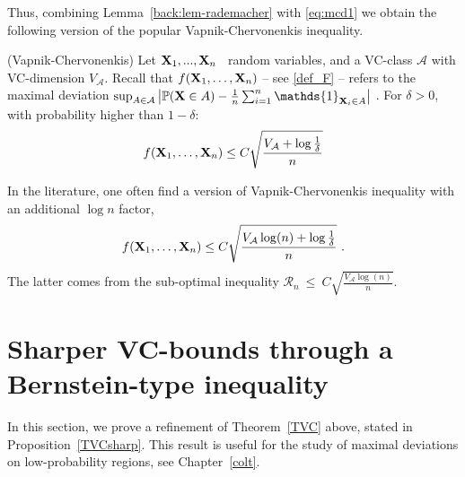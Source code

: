 Thus, combining Lemma~\ref{back:lem-rademacher} with \eqref{eq:mcd1} we obtain the following version of the popular Vapnik-Chervonenkis inequality.
\begin{theorem}{\sc (Vapnik-Chervonenkis)}
\label{TVC}
Let $\mathbf X_1,...,\mathbf X_n$ \iid~random variables, and a VC-class $\mathcal{A}$ with VC-dimension $V_{\mathcal{A}}$. 
Recall that $f(\mathbf X_1,\ldots,\mathbf X_n)$ -- see \eqref{def_F} -- refers to the maximal deviation $\sup_{A \in \mathcal{A}} \left | \mathbb{P}(\mb X \in A) - \frac{1}{n} \sum_{i=1}^n \mathds{1}_{\mb X_i \in A} \right|~$. For $\delta>0$, with probability higher than $1-\delta$:
\begin{align*}
f(\mb X_1,\ldots,\mb X_n) \le C \sqrt{\frac{V_{\mathcal{A}} + \log{\frac{1}{\delta}}}{n}} %
\end{align*}
\end{theorem}
In the literature, one often find a version of Vapnik-Chervonenkis inequality with an additional $\log n$ factor,
\begin{align*}
f(\mb X_1,\ldots,\mb X_n) \le C \sqrt{\frac{V_{\mathcal{A}}\log(n) + \log{\frac{1}{\delta}}}{n}}~. %
\end{align*}
The latter comes %
from the sub-optimal inequality $\mathcal{R}_n ~\le~ C \sqrt{\frac{V_{\mathcal{A}}\log(n)}{n}}$.%

\section{Sharper VC-bounds through a Bernstein-type inequality}
\label{sec:concentration-contrib}

In this section, we prove a refinement of Theorem~\ref{TVC} above, stated in Proposition~\ref{TVCsharp}. This result is useful for the study of maximal deviations on low-probability regions, see Chapter~\ref{colt}.


